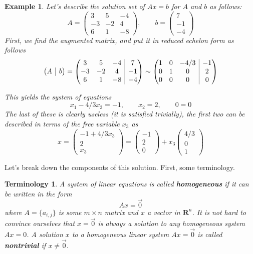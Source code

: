\documentclass[12pt]{article}
\makeatletter
\numberwithin{equation}{subsection}
\numberwithin{figure}{subsection}
\theoremstyle{note}
\newtheorem{example}[subsection]{Example}
\newtheorem{terminology}[subsection]{Terminology}
\newenvironment{amatrix}[1]{%
  \left(\begin{array}{@{}*{#1}{c}|c@{}}
}{%
  \end{array}\right)
}
\makeatother
\begin{document}
\begin{example}\label{ex-hom-nonhom}
Let's describe the solution set of $Ax=b$ for $A$ and $b$ as follows: \[ A=\begin{pmatrix} 3 & 5 & -4 \\ -3 & -2 & 4 \\ 6 & 1 & -8 \end{pmatrix}, \qquad b=\begin{pmatrix} 7 \\ -1 \\ -4 \end{pmatrix} \]
First, we find the augmented matrix, and put it in reduced echelon form as follows \[ \begin{amatrix}{1} A & b \end{amatrix}=\begin{amatrix}{3}3 & 5 & -4 & 7 \\ -3 & -2 & 4& -1 \\ 6 & 1 & -8 & -4 \end{amatrix} \sim \begin{amatrix}{3} 1 & 0 & -4/3 & -1 \\ 0 & 1 & 0 & 2 \\ 0 & 0 & 0 & 0 \end{amatrix}\]


This yields the system of equations \[ x_1-4/3x_3=-1,\qquad x_2=2, \qquad 0 =0\]
The last of these is clearly useless (it is satisfied trivially), the first two can be described in terms of the free variable $x_3$ as \[ x=\begin{pmatrix} -1 + 4/3 x_3 \\ 2 \\ x_3 \end{pmatrix} = \begin{pmatrix} -1 \\ 2 \\ 0 \end{pmatrix}+ x_3 \begin{pmatrix} 4/3 \\ 0 \\ 1 \end{pmatrix} \] 
\end{example}

Let's break down the components of this solution. First, some terminology.

\begin{terminology} A system of linear equations is called \textbf{homogeneous} if it can be written in the form \begin{equation} Ax=\vec{0}\end{equation} where $A=\{a_{i,j}\}$ is some $m\times n$ matrix and $x$ a vector in $\mathbf{R}^n$. It is not hard to convince ourselves that $x=\vec{0}$ is always a solution to any homogeneous system $Ax=0$. A solution $x$ to a homogeneous linear system $Ax=\vec{0}$ is called \textbf{nontrivial} if $x\neq \vec{0}$. 
\end{terminology}
\end{document}
